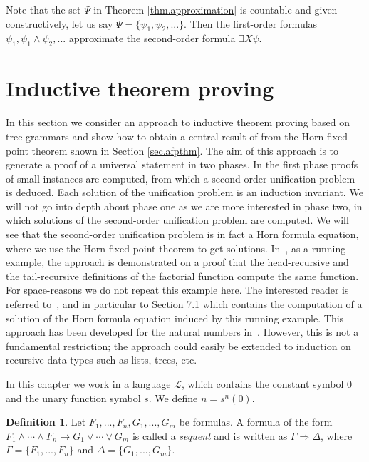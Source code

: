 \documentclass[acmsmall]{acmart}
\theoremstyle{plain}
\theoremstyle{definition}
\newtheorem{definition}[theorem]{Definition}
\newcommand{\calL}{\mathcal{L}}
\newcommand{\mybar}[1]{\overline{#1}}
\begin{document}
Note that the set $\Psi$ in Theorem \ref{thm.approximation} is countable and given constructively, let us say $\Psi = \{\psi_1,\psi_2,...\}$. Then the first-order formulas $\psi_1, \psi_1 \land \psi_2,...$ approximate the second-order formula $\exists \mybar{X} \psi$.


\section{Inductive theorem proving}\label{sec.IndProving}

In this section we consider an approach to inductive theorem proving based on tree
 grammars \cite{Eberhard15Inductive} and show how to obtain a central result of \cite{Eberhard15Inductive} from the Horn fixed-point theorem shown in Section \ref{sec.afpthm}. The aim of this approach is to generate a proof of a universal statement in two phases. In the first phase proofs of small instances are computed, from which a second-order unification problem is deduced. Each solution of the unification problem is an induction invariant. We will not go into depth about phase one as we are more interested in phase two, in which solutions of the second-order unification problem are computed. We will see that the second-order unification problem is in fact a Horn formula equation, where we use the Horn fixed-point theorem to get solutions.
In~\cite{Eberhard15Inductive}, as a running example, the approach is demonstrated on a proof
 that the head-recursive and the tail-recursive definitions of the factorial function compute
 the same function.
For space-reasons we do not repeat this example here.
The interested reader is referred to~\cite{Eberhard15Inductive}, and in particular
 to Section 7.1 which contains the computation of a solution of the
 Horn formula equation induced by this running example.
This approach has been developed for the natural numbers in~\cite{Eberhard15Inductive}.
However, this is not a fundamental restriction; the approach could easily be extended to
 induction on recursive data types such as lists, trees, etc.


In this chapter we work in a language $\calL$, which contains the constant symbol $0$ and the unary function symbol $s$. We define $\mybar{n} = s^n(0)$.


\begin{definition}
	Let $F_1,...,F_n,G_1,...,G_m$ be formulas. A formula of the form $F_1 \wedge \cdots \wedge F_n \rightarrow G_1 \vee \cdots \vee G_m$ is called a \emph{sequent} and is written as $\Gamma \Rightarrow \Delta$, where $\Gamma = \{F_1,...,F_n\}$ and $\Delta = \{G_1,...,G_m\}$.
\end{definition}
\end{document}
